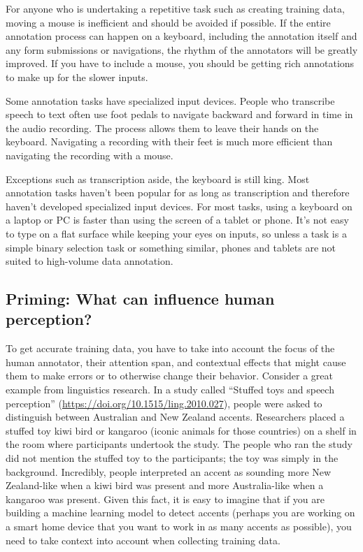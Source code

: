 \documentclass[sigconf,nonacm,screen,pbalance]{acmart}
\begin{document}
For
anyone who is undertaking a repetitive task such as creating training data, moving a
mouse is inefficient and should be avoided if possible. If the entire annotation process
can happen on a keyboard, including the annotation itself and any form submissions or
navigations, the rhythm of the annotators will be greatly improved. If you have to
include a mouse, you should be getting rich annotations to make up for the slower
inputs.

Some
annotation tasks have specialized input devices. People who transcribe speech to text
often use foot pedals to navigate backward and forward in time in the audio recording.
The process allows them to leave their hands on the keyboard. Navigating a recording
with their feet is much more efficient than navigating the recording with a mouse.

Exceptions
such as transcription aside, the keyboard is still king. Most annotation tasks haven't
been popular for as long as transcription and therefore haven't developed specialized
input devices. For most tasks, using a keyboard on a laptop or PC is faster than using
the screen of a tablet or phone. It's not easy to type on a flat surface while keeping
your eyes on inputs, so unless a task is a simple binary selection task or something
similar, phones and tablets are not suited to high-volume data
annotation.

\subsection{Priming: What can influence human perception?}

To
get
accurate training data, you have to take into account the focus of the human annotator,
their attention span, and contextual effects that might cause them to make errors or to
otherwise change their behavior. Consider a great example from linguistics research. In
a study called ``Stuffed toys and speech perception'' (\href{https://doi.org/10.1515/ling.2010.027}{https://doi.org/10.1515/ling.2010.027}),
people were asked to distinguish between Australian and New Zealand accents. Researchers
placed a stuffed toy kiwi bird or kangaroo (iconic animals for those countries) on a
shelf in the room where participants undertook the study. The people who ran the study
did not mention the stuffed toy to the participants; the toy was simply in the
background. Incredibly, people interpreted an accent as sounding more New Zealand-like
when a kiwi bird was present and more Australia-like when a kangaroo was present. Given
this fact, it is easy to imagine that if you are building a machine learning model to
detect accents (perhaps you are working on a smart home device that you want to work in
as many accents as possible), you need to take context into account when collecting
training data.
\end{document}
